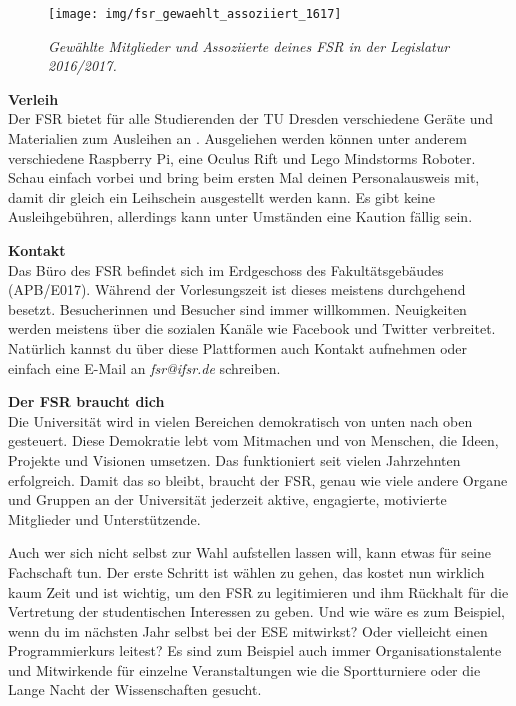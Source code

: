 \begin{figure}[h!]
\centering
\texttt{[image: img/fsr\_gewaehlt\_assoziiert\_1617]}
\caption*{\small \textit{Gewählte Mitglieder und Assoziierte deines FSR in der Legislatur 2016/2017.}}
\end{figure}

\textbf{Verleih} \\
Der FSR bietet für alle Studierenden der TU Dresden verschiedene Geräte und Materialien zum Ausleihen an . 
Ausgeliehen werden können unter anderem verschiedene Raspberry Pi, eine Oculus Rift und Lego Mindstorms Roboter.
Schau einfach vorbei und bring beim ersten Mal deinen Personalausweis mit, damit dir gleich ein Leihschein ausgestellt werden kann. 
Es gibt keine Ausleihgebühren, allerdings kann unter Umständen eine Kaution fällig sein.

\textbf{Kontakt} \\
Das Büro des FSR befindet sich im Erdgeschoss des Fakultätsgebäudes (APB/E017). Während der Vorlesungszeit ist dieses meistens durchgehend besetzt. Besucherinnen und Besucher sind immer willkommen. Neuigkeiten werden meistens über die sozialen Kanäle wie Facebook  und Twitter  verbreitet. Natürlich kannst du über diese Plattformen auch Kontakt aufnehmen oder einfach eine E-Mail an \textit{fsr@ifsr.de} schreiben.

\textbf{Der FSR braucht dich} \\
Die Universität wird in vielen Bereichen demokratisch von unten nach oben gesteuert. Diese Demokratie lebt vom Mitmachen und von Menschen, die Ideen, Projekte und Visionen umsetzen.
Das funktioniert seit vielen Jahrzehnten erfolgreich.
Damit das so bleibt, braucht der FSR, genau wie viele andere Organe und Gruppen an der Universität jederzeit aktive, engagierte, motivierte Mitglieder und Unterstützende.

Auch wer sich nicht selbst zur Wahl aufstellen lassen will, kann etwas für seine Fachschaft tun.
Der erste Schritt ist wählen zu gehen, das kostet nun wirklich kaum Zeit und ist wichtig, um den FSR zu legitimieren und ihm Rückhalt für die Vertretung der studentischen Interessen zu geben.
Und wie wäre es zum Beispiel, wenn du im nächsten Jahr selbst bei der ESE mitwirkst? Oder vielleicht einen Programmierkurs leitest?
Es sind zum Beispiel auch immer Organisationstalente und Mitwirkende für einzelne Veranstaltungen wie die Sportturniere oder die Lange Nacht der Wissenschaften gesucht.

